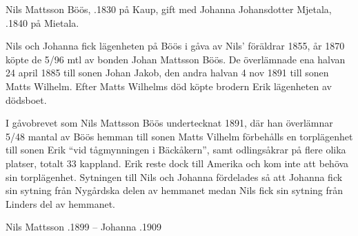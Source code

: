 Nils Mattsson Böös, .1830 på Kaup, gift med  Johanna Johansdotter Mjetala, .1840 på Mietala.
\begin{jhchildren}
  \item {}
  \item {}
  \item {}
  \item {}
  \item {}
  \item {}
  \item {}
  \item {}
  \item {}
  \item {}
  \item {}
  \item {}
\end{jhchildren}
Nils och Johanna fick lägenheten på Böös i gåva av Nils' föräldrar 1855, år 1870 köpte de 5/96 mtl av bonden Johan Mattsson Böös. De överlämnade ena halvan 24 april 1885 till sonen Johan Jakob, den andra halvan 4 nov 1891 till sonen Matts Wilhelm. Efter Matts 				Wilhelms död köpte brodern Erik lägenheten av dödsboet.

I gåvobrevet som Nils Mattsson Böös undertecknat 1891, där han överlämnar 5/48 mantal av Böös hemman till sonen Matts Vilhelm förbehålls en torplägenhet till sonen Erik ``vid tågmynningen i Bäckåkern'', samt odlingsåkrar på flere olika platser, totalt 33 kappland. Erik reste dock till Amerika och kom inte att behöva sin torplägenhet. Sytningen till Nils och Johanna fördelades så att Johanna fick sin sytning från Nygårdska delen av hemmanet medan Nils fick sin sytning från Linders del av hemmanet.

Nils Mattsson .1899  --  Johanna .1909


